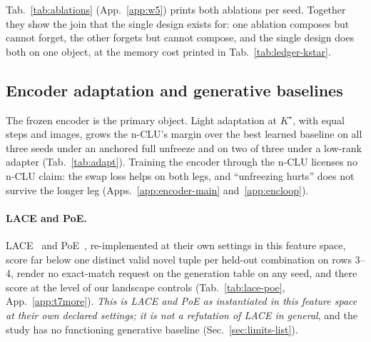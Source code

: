 \documentclass{article} %
\newcommand{\Kstar}{\ensuremath{K^{\star}}}
\begin{document}
Tab.~\ref{tab:ablations} (App.~\ref{app:w5}) prints both ablations per seed. Together they
show the join that the single design exists for: one ablation composes but cannot forget, the
other forgets but cannot compose, and the single design does both on one object, at the memory
cost printed in Tab.~\ref{tab:ledger-kstar}.

\subsection{Encoder adaptation and generative baselines}
\label{sec:adapt}\label{sec:bard}

The frozen encoder is the primary object. Light adaptation at $\Kstar$, with equal steps and
images, grows the n-CLU's margin over the best learned baseline on all three seeds under an
anchored full unfreeze and on two
of three under a low-rank adapter (Tab.~\ref{tab:adapt}). %
Training the encoder through the n-CLU licenses no n-CLU claim: the swap loss helps on both legs,
and ``unfreezing hurts'' does not survive the longer leg (Apps.~\ref{app:encoder-main}
and~\ref{app:encloop}).

\paragraph{LACE and PoE.}
LACE~\citep{nie_controllable_2021} and PoE~\citep{hinton_training_2002}, re-implemented at their own
settings in this feature space, score far below one distinct valid novel tuple per held-out combination %
on rows 3--4, render no exact-match request on the generation table on any seed, and there score at
the level of our landscape controls
(Tab.~\ref{tab:lace-poe}, App.~\ref{app:t7more}). \emph{This is LACE and PoE as instantiated in
this feature space at their own declared settings; it is not a refutation of LACE in general}, and
the study has no functioning generative baseline (Sec.~\ref{sec:limits-list}).
\end{document}

